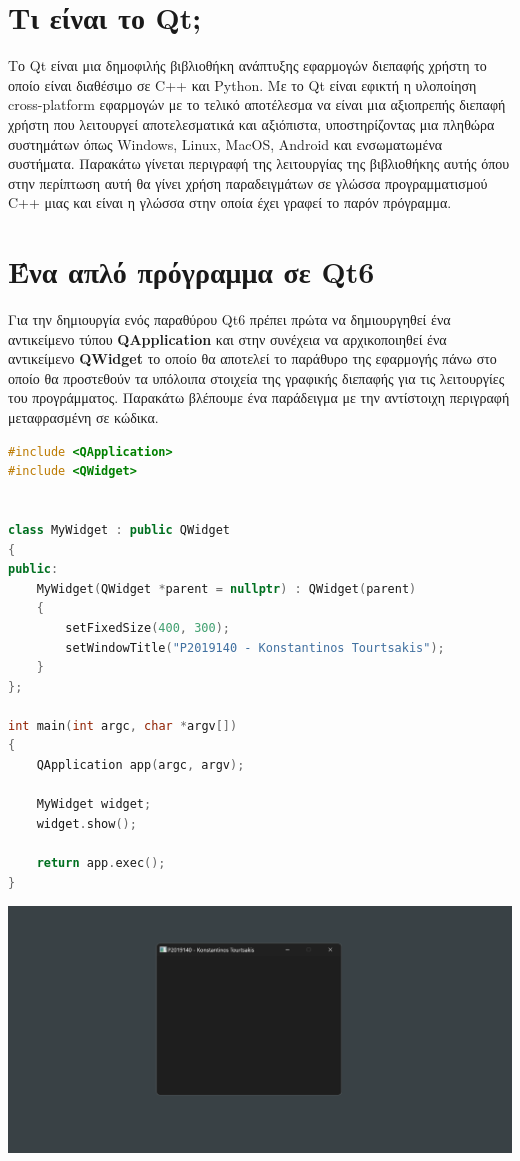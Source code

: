




\section{Τι είναι το Qt;}
Το Qt είναι μια δημοφιλής βιβλιοθήκη ανάπτυξης εφαρμογών διεπαφής χρήστη το
οποίο είναι διαθέσιμο σε C++ και Python. Με το Qt
είναι εφικτή η υλοποίηση cross-platform εφαρμογών με το τελικό αποτέλεσμα
να είναι μια αξιοπρεπής διεπαφή χρήστη που λειτουργεί αποτελεσματικά και
αξιόπιστα, υποστηρίζοντας μια πληθώρα συστημάτων όπως Windows, Linux, MacOS, Android και ενσωματωμένα συστήματα. 
Παρακάτω γίνεται περιγραφή της λειτουργίας της βιβλιοθήκης αυτής όπου στην 
περίπτωση αυτή θα γίνει χρήση παραδειγμάτων σε γλώσσα προγραμματισμού C++ 
μιας και είναι η γλώσσα στην οποία έχει γραφεί το παρόν πρόγραμμα.

\section{Ένα απλό πρόγραμμα σε Qt6}
Για την δημιουργία ενός παραθύρου Qt6 πρέπει πρώτα να δημιουργηθεί ένα αντικείμενο
τύπου \textbf{QApplication} και στην συνέχεια να αρχικοποιηθεί ένα αντικείμενο 
\textbf{QWidget} το οποίο θα αποτελεί το παράθυρο της εφαρμογής πάνω στο
οποίο θα προστεθούν τα υπόλοιπα στοιχεία της γραφικής διεπαφής για τις λειτουργίες
του προγράμματος. Παρακάτω βλέπουμε ένα παράδειγμα με την αντίστοιχη περιγραφή
μεταφρασμένη σε κώδικα.

\begin{lstlisting}[language=C++, style=cppstyle]
#include <QApplication>
#include <QWidget>


class MyWidget : public QWidget 
{
public:
    MyWidget(QWidget *parent = nullptr) : QWidget(parent) 
    {
        setFixedSize(400, 300);
        setWindowTitle("P2019140 - Konstantinos Tourtsakis");
    }
};

int main(int argc, char *argv[]) 
{
    QApplication app(argc, argv);

    MyWidget widget;
    widget.show();

    return app.exec();
}

\end{lstlisting}

\includegraphics[width=1.0\textwidth]{./images/simple_qt6_app.png}

